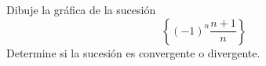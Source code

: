 \item Dibuje la gráfica de la sucesión 
    \[ \left\{ (-1)^n \frac{n + 1}{n} \right\} \]
    Determine si la sucesión es convergente o divergente.

